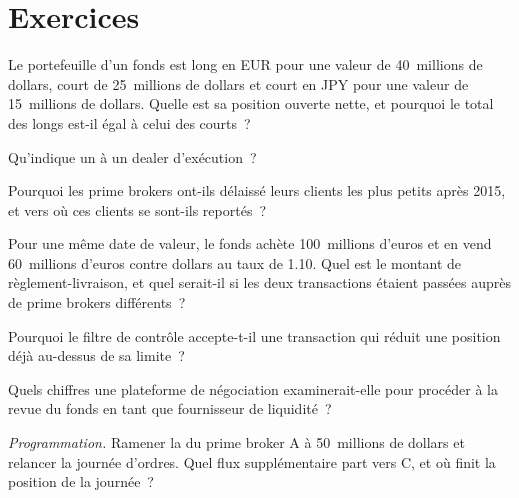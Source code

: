 \section{Exercices}

\begin{exercise}[$\star$]\label{exo:m2:getting-access-fx:1}
Le portefeuille d'un fonds est long en EUR pour une valeur de 40~millions de dollars, court de 25~millions de dollars et court en JPY pour une valeur de
15~millions de dollars. Quelle est sa position ouverte nette, et pourquoi le total des longs est-il égal à celui des courts~?
\end{exercise}

\begin{exercise}[$\star$]\label{exo:m2:getting-access-fx:2}
Qu'indique un  à un dealer d'exécution~?
\end{exercise}

\begin{exercise}[$\star$]\label{exo:m2:getting-access-fx:3}
Pourquoi les prime brokers ont-ils délaissé leurs clients les plus petits après 2015, et vers où ces clients se sont-ils reportés~?
\end{exercise}

\begin{exercise}[$\star\star$]\label{exo:m2:getting-access-fx:4}
Pour une même date de valeur, le fonds achète 100~millions d'euros et en vend 60~millions d'euros contre
dollars au taux de 1.10. Quel est le montant de règlement-livraison, et quel serait-il si les deux transactions
étaient passées auprès de prime brokers différents~?
\end{exercise}

\begin{exercise}[$\star\star$]\label{exo:m2:getting-access-fx:5}
Pourquoi le filtre de contrôle accepte-t-il une transaction qui réduit une position déjà au-dessus de sa limite~?
\end{exercise}

\begin{exercise}[$\star\star$]\label{exo:m2:getting-access-fx:6}
Quels chiffres une plateforme de négociation examinerait-elle pour procéder à la revue du fonds en tant que fournisseur de liquidité~?
\end{exercise}

\begin{exercise}[$\star\star\star$]\label{exo:m2:getting-access-fx:7}
\emph{Programmation.} Ramener la  du prime broker A à 50~millions de dollars et relancer la
journée d'ordres. Quel flux supplémentaire part vers C, et où finit la
position de la journée~?
\end{exercise}

